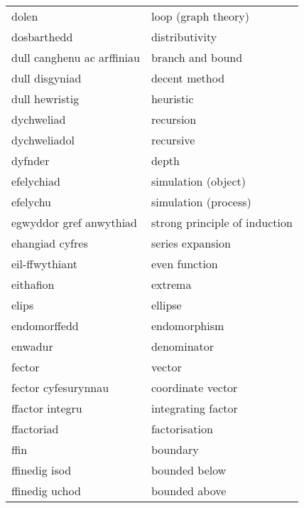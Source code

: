 \begin{supertabular}{p{0.22\textwidth}p{0.22\textwidth}}
                          dolen &              loop (graph theory) \\
                    dosbarthedd &                   distributivity \\
     dull canghenu ac arffiniau &                 branch and bound \\
                 dull disgyniad &                    decent method \\
                 dull hewristig &                        heuristic \\
                     dychweliad &                        recursion \\
                   dychweliadol &                        recursive \\
                        dyfnder &                            depth \\
                     efelychiad &              simulation (object) \\
                       efelychu &             simulation (process) \\
        egwyddor gref anwythiad &    strong principle of induction \\
                ehangiad cyfres &                 series expansion \\
                 eil-ffwythiant &                    even function \\
                      eithafion &                          extrema \\
                          elips &                          ellipse \\
                   endomorffedd &                     endomorphism \\
                        enwadur &                      denominator \\
                         fector &                           vector \\
            fector cyfesurynnau &                coordinate vector \\
                ffactor integru &               integrating factor \\
                     ffactoriad &                    factorisation \\
                           ffin &                         boundary \\
                  ffinedig isod &                    bounded below \\
                 ffinedig uchod &                    bounded above \\

\end{supertabular}
